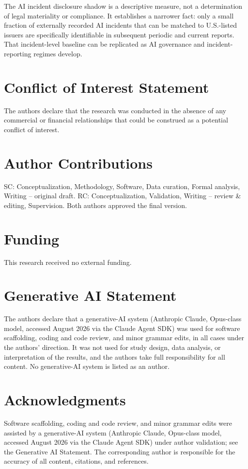 \documentclass[utf8]{FrontiersinHarvard}
\begin{document}
The AI incident disclosure shadow is a descriptive measure, not a determination of legal materiality or compliance. It establishes a narrower fact: only a small fraction of externally recorded AI incidents that can be matched to U.S.-listed issuers are specifically identifiable in subsequent periodic and current reports. That incident-level baseline can be replicated as AI governance and incident-reporting regimes develop.

\section*{Conflict of Interest Statement}
The authors declare that the research was conducted in the absence of any commercial or financial relationships that could be construed as a potential conflict of interest.

\section*{Author Contributions}
SC: Conceptualization, Methodology, Software, Data curation, Formal analysis, Writing -- original draft. RC: Conceptualization, Validation, Writing -- review \& editing, Supervision. Both authors approved the final version.

\section*{Funding}
This research received no external funding.

\section*{Generative AI Statement}
The authors declare that a generative-AI system (Anthropic Claude, Opus-class model, accessed August 2026 via the Claude Agent SDK) was used for software scaffolding, coding and code review, and minor grammar edits, in all cases under the authors' direction. It was not used for study design, data analysis, or interpretation of the results, and the authors take full responsibility for all content. No generative-AI system is listed as an author.

\section*{Acknowledgments}
Software scaffolding, coding and code review, and minor grammar edits were assisted by a generative-AI system (Anthropic Claude, Opus-class model, accessed August 2026 via the Claude Agent SDK) under author validation; see the Generative AI Statement. The corresponding author is responsible for the accuracy of all content, citations, and references.
\end{document}
